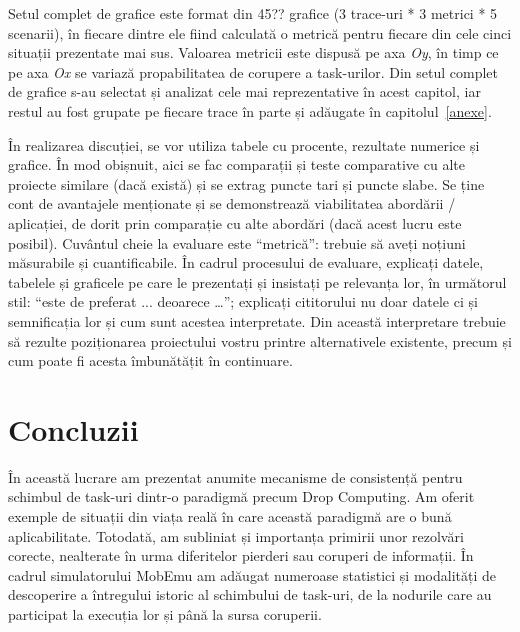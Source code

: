 \documentclass[12pt,a4paper]{report}
\begin{document}
Setul complet de grafice este format din 45?? grafice  (3 trace-uri * 3 metrici * 5 scenarii), în fiecare dintre ele fiind calculată o metrică pentru fiecare din cele cinci situații prezentate mai sus. Valoarea metricii este dispusă pe axa \textit{Oy}, în timp ce pe axa \textit{Ox} se variază propabilitatea de corupere a task-urilor. Din setul complet de grafice s-au selectat și analizat cele mai reprezentative în acest capitol, iar restul au fost grupate pe fiecare trace în parte și adăugate în capitolul~\ref{anexe}.



În realizarea discuției, se vor utiliza tabele cu procente, rezultate numerice și grafice. În mod obișnuit, aici se fac comparații și teste comparative cu alte proiecte similare (dacă există) și se extrag puncte tari și puncte slabe. Se ține cont de avantajele menționate și se demonstrează viabilitatea abordării / aplicației, de dorit prin comparație cu alte abordări (dacă acest lucru este posibil). Cuvântul cheie la evaluare este ``metrică'': trebuie să aveți noțiuni măsurabile și cuantificabile. În cadrul procesului de evaluare, explicați datele, tabelele și graficele pe care le prezentați și insistați pe relevanța lor, în următorul stil: ``este de preferat ... deoarece …''; explicați cititorului nu doar datele ci și semnificația lor și cum sunt acestea interpretate. Din această interpretare trebuie să rezulte poziționarea proiectului vostru printre alternativele existente, precum și cum poate fi acesta îmbunătățit în continuare.

\chapter{Concluzii} \label{concluzii}
În această lucrare am prezentat anumite mecanisme de consistență pentru schimbul de task-uri dintr-o paradigmă precum Drop Computing. Am oferit exemple de situații din viața reală în care această paradigmă are o bună aplicabilitate. Totodată, am subliniat și importanța primirii unor rezolvări corecte, nealterate în urma diferitelor pierderi sau coruperi de informații. În cadrul simulatorului MobEmu am adăugat numeroase statistici și modalități de descoperire a întregului istoric al schimbului de task-uri, de la nodurile care au participat la execuția lor și până la sursa coruperii.
\end{document}
